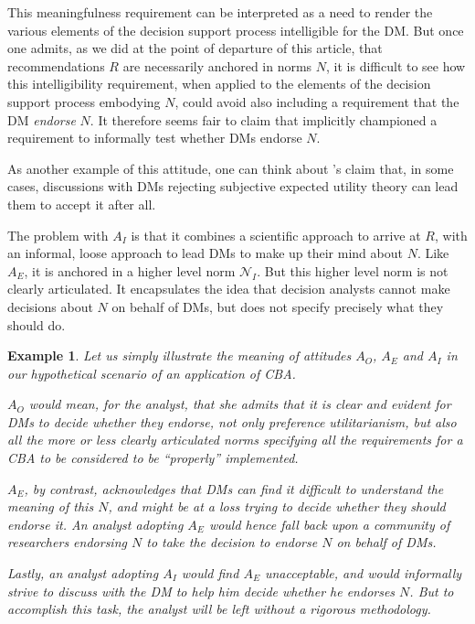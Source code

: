 \documentclass[preprint, french, english, 11pt, authoryear]{elsarticle}%
\newtheorem{example}{Example}
\begin{document}
This meaningfulness requirement can be interpreted as a need to render the various elements of the decision support process intelligible for the \ac{DM}. But once one admits, as we did at the point of departure of this article, that recommendations $R$ are necessarily anchored in norms $N$, it is difficult to see how this intelligibility requirement, when applied to  the elements of the decision support process embodying $N$, could avoid also including a requirement that the \ac{DM} \emph{endorse} $N$. It therefore seems fair to claim that \citet{roy_multicriteria_1996} implicitly championed a requirement to informally test whether \acp{DM} endorse $N$. 

As another example of this attitude, one can think about \citet{raiffa_back_1985}’s claim that, in some cases, discussions with \acp{DM} rejecting subjective expected utility theory can lead them to accept it after all.

The problem with $A_I$ is that it combines a scientific approach to arrive at $R$, with an informal, loose approach to lead \acp{DM} to make up their mind about $N$.
Like $A_E$, it is anchored in a higher level norm $\mathscr{N}_I$. But this higher level norm is not clearly articulated. It encapsulates the idea that decision analysts cannot make decisions about $N$ on behalf of \acp{DM}, but does not specify precisely what they should do.

\begin{example}
Let us simply illustrate the meaning of attitudes $A_O$, $A_E$ and $A_I$ in our hypothetical scenario of an application of CBA.

$A_O$ would mean, for the analyst, that she admits that it is clear and evident for \acp{DM} to decide whether they endorse, not only preference utilitarianism, but also all the more or less clearly articulated norms specifying all the requirements for a CBA to be considered to be ``properly'' implemented.

$A_E$, by contrast, acknowledges that \acp{DM} can find it difficult to understand the meaning of this $N$, and might be at a loss trying to decide whether they should endorse it. An analyst adopting $A_E$ would hence fall back upon a community of researchers endorsing $N$ to take the decision to endorse $N$ on behalf of \acp{DM}.

Lastly, an analyst adopting $A_I$ would find $A_E$ unacceptable, and would informally strive to discuss with the \ac{DM} to help him decide whether he endorses $N$. But to accomplish this task, the analyst will be left without a rigorous methodology.
\end{example}
\end{document}
